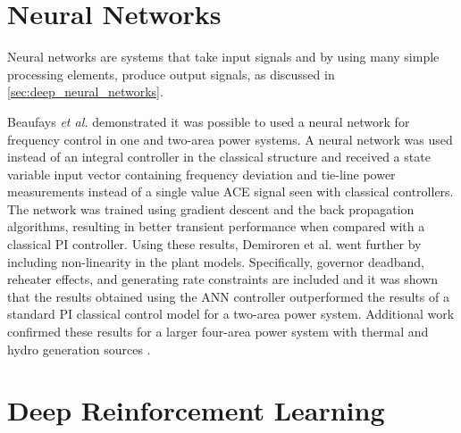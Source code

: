 \section{Neural Networks}
Neural networks are systems that take input signals and by using many simple processing elements, produce output signals, as discussed in \textsection \ref{sec:deep_neural_networks}.

Beaufays \textit{et al.} \cite{Beaufays1994} demonstrated it was possible to used a neural network for frequency control in one and two-area power systems. A neural network was used instead of an integral controller in the classical structure and received a state variable input vector containing frequency deviation and tie-line power measurements instead of a single value ACE signal seen with classical controllers. The network was trained using gradient descent and the back propagation algorithms, resulting in better transient performance when compared with a classical PI controller. Using these results, Demiroren et al. \cite{Demiroren2001} went further by including non-linearity in the plant models. Specifically, governor deadband, reheater effects, and generating rate constraints are included and it was shown that the results obtained using the ANN controller outperformed the results of a standard PI classical control model for a two-area power system. Additional work confirmed these results for a larger four-area power system with thermal and hydro generation sources \cite{Zeynelgil2002}.


\section{Deep Reinforcement Learning}
